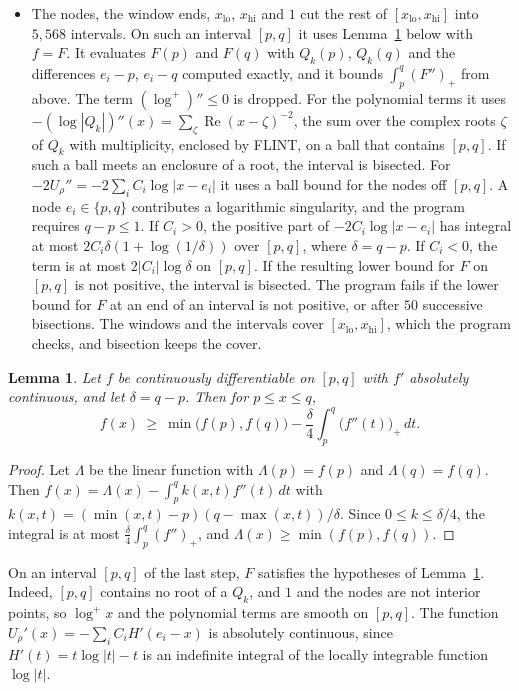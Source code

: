 \documentclass[11pt]{amsart}
\newtheorem{lemma}[theorem]{Lemma}
\theoremstyle{remark}
\numberwithin{equation}{section}
\newcommand{\logp}{\log^{+}}
\newcommand{\NInitA}{5{,}568}
\begin{document}
\begin{itemize}[leftmargin=1.5em]
\item The nodes, the window ends, $x_{\mathrm{lo}}$, $x_{\mathrm{hi}}$ and $1$ cut the rest of $[x_{\mathrm{lo}},x_{\mathrm{hi}}]$ into $\NInitA$ intervals. On such an interval $[p,q]$ it uses Lemma~\ref{lem:chord} below with $f=F$. It evaluates $F(p)$ and $F(q)$ with $Q_k(p)$, $Q_k(q)$ and the differences $e_i-p$, $e_i-q$ computed exactly, and it bounds $\int_p^q(F'')_+$ from above. The term $(\logp)''\le0$ is dropped. For the polynomial terms it uses $-(\log|Q_k|)''(x)=\sum_\zeta\operatorname{Re}(x-\zeta)^{-2}$, the sum over the complex roots $\zeta$ of $Q_k$ with multiplicity, enclosed by FLINT, on a ball that contains $[p,q]$. If such a ball meets an enclosure of a root, the interval is bisected. For $-2U_\rho''=-2\sum_iC_i\log|x-e_i|$ it uses a ball bound for the nodes off $[p,q]$. A node $e_i\in\{p,q\}$ contributes a logarithmic singularity, and the program requires $q-p\le1$. If $C_i>0$, the positive part of $-2C_i\log|x-e_i|$ has integral at most $2C_i\delta(1+\log(1/\delta))$ over $[p,q]$, where $\delta=q-p$. If $C_i<0$, the term is at most $2|C_i|\log\delta$ on $[p,q]$. If the resulting lower bound for $F$ on $[p,q]$ is not positive, the interval is bisected. The program fails if the lower bound for $F$ at an end of an interval is not positive, or after $50$ successive bisections. The windows and the intervals cover $[x_{\mathrm{lo}},x_{\mathrm{hi}}]$, which the program checks, and bisection keeps the cover.
\end{itemize}

\begin{lemma}\label{lem:chord}
Let $f$ be continuously differentiable on $[p,q]$ with $f'$ absolutely continuous, and let $\delta=q-p$. Then for $p\le x\le q$,
\[
f(x)\ \ge\ \min\bigl(f(p),f(q)\bigr)-\frac\delta4\int_p^q\bigl(f''(t)\bigr)_+\,dt.
\]
\end{lemma}

\begin{proof}
Let $\Lambda$ be the linear function with $\Lambda(p)=f(p)$ and $\Lambda(q)=f(q)$. Then $f(x)=\Lambda(x)-\int_p^qk(x,t)f''(t)\,dt$ with $k(x,t)=(\min(x,t)-p)(q-\max(x,t))/\delta$. Since $0\le k\le\delta/4$, the integral is at most $\frac\delta4\int_p^q(f'')_+$, and $\Lambda(x)\ge\min(f(p),f(q))$.
\end{proof}

On an interval $[p,q]$ of the last step, $F$ satisfies the hypotheses of Lemma~\ref{lem:chord}. Indeed, $[p,q]$ contains no root of a $Q_k$, and $1$ and the nodes are not interior points, so $\logp x$ and the polynomial terms are smooth on $[p,q]$. The function $U_\rho'(x)=-\sum_iC_iH'(e_i-x)$ is absolutely continuous, since $H'(t)=t\log|t|-t$ is an indefinite integral of the locally integrable function $\log|t|$.
\end{document}
